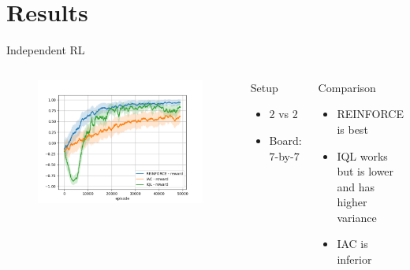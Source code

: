 \documentclass{beamer}
\begin{document}
\section{Results}
\begin{frame}{Independent RL}
\begin{columns}
\begin{figure}[htp]
    \centering
    \includegraphics[width=\textwidth]{images/experiment4/compare_reward.png}
\end{figure}

\begin{block}{Setup}
\begin{itemize}
    \item $2$ vs $2$
    \item Board: $7$-by-$7$
\end{itemize}
\end{block}
\begin{block}{Comparison}
\begin{itemize}
    \item REINFORCE is best
    \item IQL works but is lower and has higher variance
    \item IAC is inferior
\end{itemize}
\end{block}
\end{columns}
\end{frame}
\end{document}
